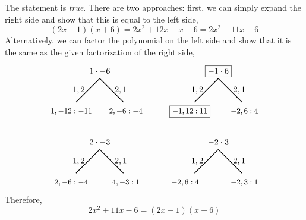 \documentclass[11pt,letterpaper]{article}
\begin{document}
\sol The statement is \textit{true}. There are two approaches: first, we can simply expand the right side and show that this is equal to the left side, 
	\[
	(2x - 1)(x + 6)= 2x^2 + 12x - x - 6= 2x^2 + 11x - 6
	\]
Alternatively, we can factor the polynomial on the left side and show that it is the same as the given factorization of the right side, \pspace
	\[
	\begin{tikzpicture}
	\node at (0,0) {$1 \cdot -6$};
	\draw[line width=0.03cm] (0,-0.3) -- node[left] {$1, 2$} ++ (-1,-1);
	\draw[line width=0.03cm] (0,-0.3) -- node[right] {$2, 1$} ++ (1,-1);
	\node at (-1.2,-1.7) {\small$1, -12: -11$};
	\node at (1.1,-1.7) {\small$2, -6: -4$};
	
	\node at (5,0) {$\boxed{-1 \cdot 6}$};
	\draw[line width=0.03cm] (5,-0.3) -- node[left] {$1, 2$} ++ (-1,-1);
	\draw[line width=0.03cm] (5,-0.3) -- node[right] {$2, 1$} ++ (1,-1);
	\node at (3.8,-1.7) {\small$\boxed{-1, 12: 11}$};
	\node at (6.1,-1.7) {\small$-2, 6: 4$};
	
	\node at (0,-3) {$2 \cdot -3$};
	\draw[line width=0.03cm] (0,-3.3) -- node[left] {$1, 2$} ++ (-1,-1);
	\draw[line width=0.03cm] (0,-3.3) -- node[right] {$2, 1$} ++ (1,-1);
	\node at (-1.2,-4.7) {\small$2, -6: -4$};
	\node at (1.1,-4.7) {\small$4, -3: 1$};
	
	\node at (5,-3) {$-2 \cdot 3$};
	\draw[line width=0.03cm] (5,-3.3) -- node[left] {$1, 2$} ++ (-1,-1);
	\draw[line width=0.03cm] (5,-3.3) -- node[right] {$2, 1$} ++ (1,-1);
	\node at (3.6,-4.7) {\small$-2, 6: 4$};
	\node at (6.1,-4.7) {\small$-2, 3: 1$};
	\end{tikzpicture}
	\]	
Therefore,
	\[
	2x^2 + 11x - 6= (2x - 1)(x + 6)
	\] \pvspace{1.3cm}


\end{document}
